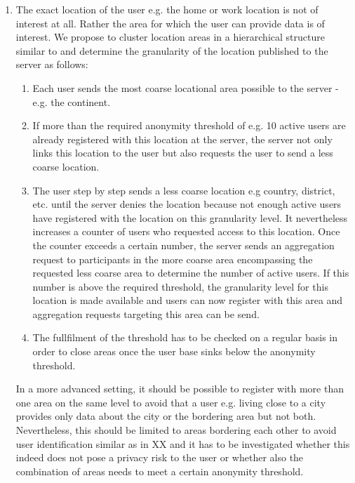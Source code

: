  \begin{enumerate}
 	\item The exact location of the user e.g. the home or work location is not of interest at all. Rather the area for which the user can provide data is of interest. We propose to cluster location areas in a hierarchical structure similar to \parencite{casper} and determine the granularity of the location published to the server as follows:
 	\begin{enumerate}
 		\item Each user sends the most coarse locational area possible to the server - e.g. the continent.
 		\item If more than the required anonymity threshold of e.g. 10 active users are already registered with this location at the server, the server not only links this location to the user but also requests the user to send a less coarse location.
 		\item The user step by step sends a less coarse location e.g country, district, etc. until the server denies the location because not enough active users have registered with the location on this granularity level. It nevertheless increases a counter of users who requested access to this location. Once the counter exceeds a certain number, the server sends an aggregation request to participants in the more coarse area encompassing the requested less coarse area to determine the number of active users. If this number is above the required threshold, the granularity level for this location is made available and users can now register with this area and aggregation requests targeting this area can be send.
 		\item The fullfilment of the threshold has to be checked on a regular basis in order to close areas once the user base sinks below the anonymity threshold.
 	\end{enumerate}
 	In a more advanced setting, it should be possible to register with more than one area on the same level to avoid that a user e.g. living close to a city provides only data about the city or the bordering area but not both. Nevertheless, this should be limited to areas bordering each other to avoid user identification similar as in XX and it has to be investigated whether this indeed does not pose a privacy risk to the user or whether also the combination of areas needs to meet a certain anonymity threshold.
 \end{enumerate}